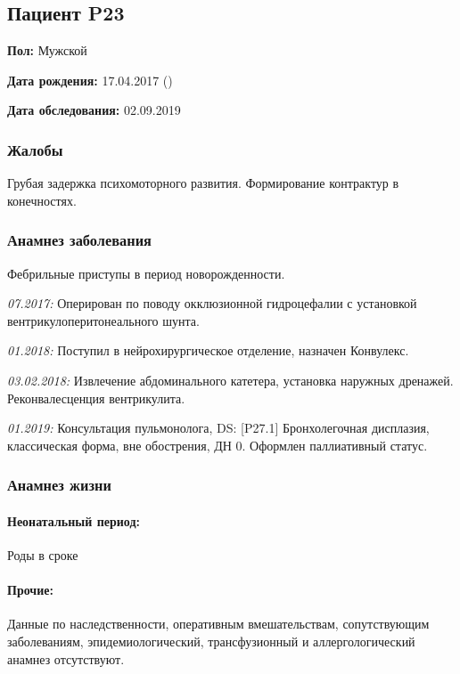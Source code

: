 \documentclass[a4paper,14pt]{extarticle}
\newcommand{\weeks}{нед.}
\newcommand{\pdate}[1]{\emph{#1:} }
\newcommand{\DS}[2]{[#2] #1}
\begin{document}
\newpage
\subsection*{Пациент P23}

\textbf{Пол:} Мужской

\textbf{Дата рождения:} 17.04.2017 ()

\textbf{Дата обследования:} 02.09.2019

\subsubsection*{Жалобы}

Грубая задержка психомоторного развития.
Формирование контрактур в конечностях.

\subsubsection*{Анамнез заболевания}

Фебрильные приступы в период новорожденности.

\pdate{07.2017} Оперирован по поводу окклюзионной гидроцефалии с установкой вентрикулоперитонеального шунта.

\pdate{01.2018} Поступил в нейрохирургическое отделение, назначен Конвулекс.

\pdate{03.02.2018} Извлечение абдоминального катетера, установка наружных дренажей. Реконвалесценция вентрикулита.

\pdate{01.2019} Консультация пульмонолога, DS: \DS{Бронхолегочная дисплазия, классическая форма, вне обострения, ДН 0}{P27.1}. Оформлен паллиативный статус.

\subsubsection*{Анамнез жизни}

\paragraph{Неонатальный период:}
Роды в сроке \numprint[\weeks]{26}

\paragraph{Прочие:} Данные по наследственности, оперативным вмешательствам, сопутствующим заболеваниям, эпидемиологический, трансфузионный и аллергологический анамнез отсутствуют.
\end{document}
